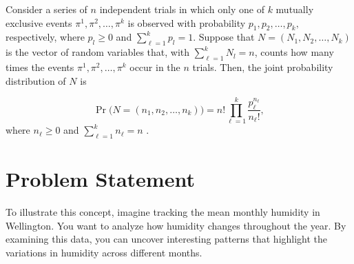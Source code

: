 Consider a series of $n$ independent trials in which only one of $k$ mutually exclusive events ${\pi}^1, {\pi}^2,\dots, {\pi}^k$ is observed with probability $p_1, p_2, \dots, p_k,$ respectively, where $p_l \geq 0$ and $\sum_{\ell=1}^{k} p_l=1.$ Suppose that $N=(N_1, N_2, \dots, N_k)$ is the vector of random variables that, with $\sum_{\ell=1}^{k} N_l=n$, counts how many times the events ${\pi}^1, {\pi}^2,\dots, {\pi}^k$ occur in the $n$ trials. Then, the joint probability distribution of $N$ is

\begin{equation}
	\Pr\big(N=(n_1,n_2,\dots, n_k)\big) = n! \prod_{\ell=1}^{k} \frac{p_\ell^{n_\ell}}{n_\ell !}, %
\end{equation}    
where $n_\ell \geq 0$ and $\sum_{\ell=1}^{k} n_\ell=n$ .


\section*{Problem Statement}


To illustrate this concept, imagine tracking the mean monthly humidity in Wellington. You want to analyze how humidity changes throughout the year. By examining this data, you can uncover interesting patterns that highlight the variations in humidity across different months. 



